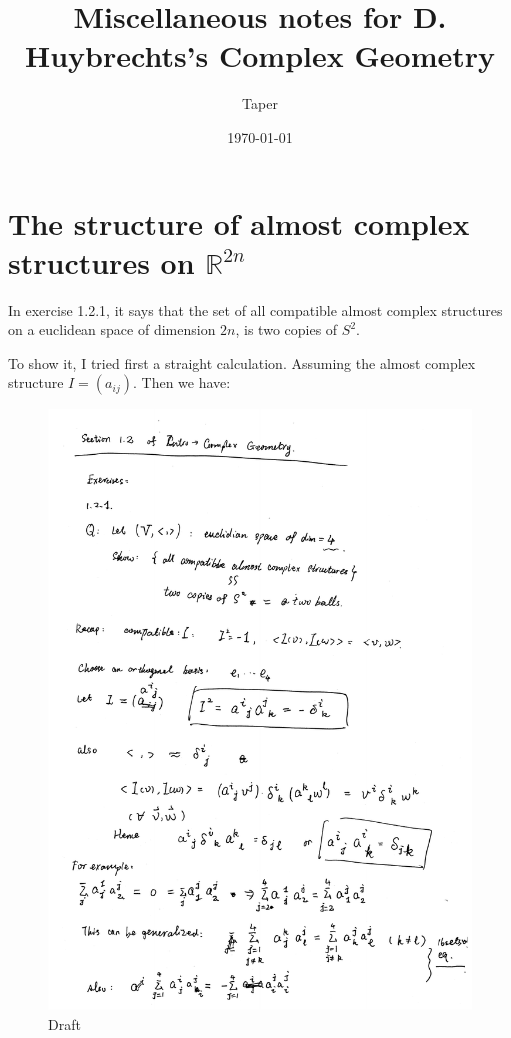 \documentclass{article}
\title{Miscellaneous notes for D. Huybrechts's Complex Geometry}
\date{\today}
\author{Taper}
\numberwithin{equation}{subsection} %
\theoremstyle{definition}
\begin{document}
\maketitle
{}
\tableofcontents
\section{The structure of almost complex structures on \texorpdfstring{$\mathbb{R}^{2n}$}{}}
\label{sec:The_structure_of_almost_complex_structures_on_R2n}
In exercise 1.2.1, it says that the set of all compatible almost complex
structures on a euclidean space of dimension $2n$, is two copies of $S^2$.

To show it, I tried first a straight calculation. Assuming the almost
complex structure $I= (a_{ij})$. Then we have:
\begin{figure}[H]
  \centering
  \includegraphics[scale=0.70]{pdfs/draft_20160908.pdf}
  \caption{Draft}
\end{figure}
\end{document}
